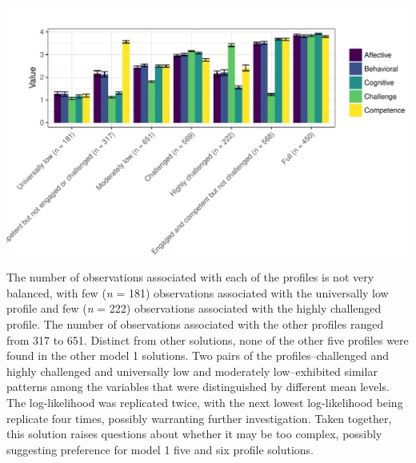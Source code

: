 \documentclass[]{msu-thesis}
\theoremstyle{definition}
\theoremstyle{definition}
\theoremstyle{definition}
\theoremstyle{remark}
\begin{document}
\begin{center}\includegraphics[width=0.9\linewidth]{rosenberg-dissertation_files/figure-latex/m1_7p-2} \end{center}

The number of observations associated with each of the profiles is not
very balanced, with few (\emph{n} = 181) observations associated with
the universally low profile and few (\emph{n} = 222) observations
associated with the highly challenged profile. The number of
observations associated with the other profiles ranged from 317 to 651.
Distinct from other solutions, none of the other five profiles were
found in the other model 1 solutions. Two pairs of the
profiles--challenged and highly challenged and universally low and
moderately low--exhibited similar patterns among the variables that were
distinguished by different mean levels. The log-likelihood was
replicated twice, with the next lowest log-likelihood being replicate
four times, possibly warranting further investigation. Taken together,
this solution raises questions about whether it may be too complex,
possibly suggesting preference for model 1 five and six profile
solutions.


\end{document}
